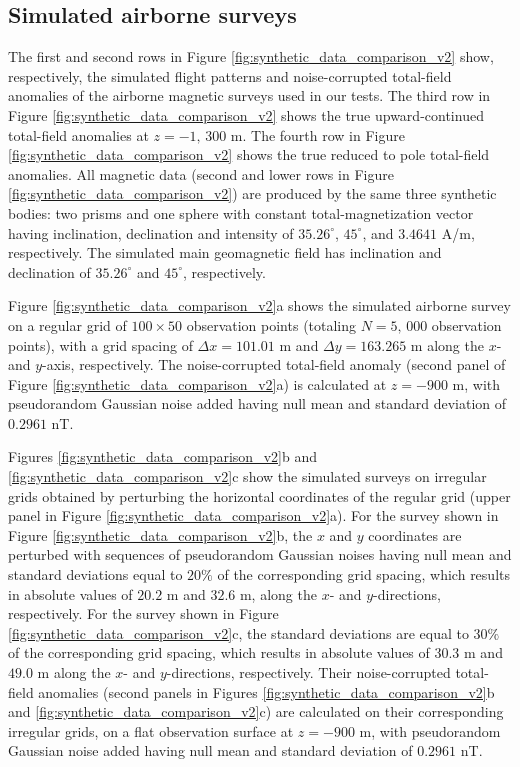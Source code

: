 \documentclass[manuscript]{geophysics}
\begin{document}
\subsection*{Simulated airborne surveys}

The first and second rows in Figure \ref{fig:synthetic_data_comparison_v2} show, respectively, 
the simulated flight patterns and noise-corrupted total-field anomalies of the airborne magnetic 
surveys used in our tests. The third row in Figure \ref{fig:synthetic_data_comparison_v2} shows 
the true upward-continued total-field anomalies at $z = -1, \, 300$ m. The fourth row in Figure \ref{fig:synthetic_data_comparison_v2} shows the true reduced to pole total-field anomalies.
All magnetic data (second and lower rows in Figure \ref{fig:synthetic_data_comparison_v2}) 
are produced by the same three synthetic bodies: two prisms and one sphere with 
constant total-magnetization vector having inclination, declination and intensity of 
$35.26^{\circ}$, $45^{\circ}$, and $3.4641$ A/m, respectively. 
The simulated main geomagnetic field has inclination and declination of $35.26^{\circ}$ and $45^{\circ}$,
respectively. 


Figure \ref{fig:synthetic_data_comparison_v2}a shows the simulated airborne survey on
a regular grid of $100 \times 50$ observation points (totaling  $N = 5,\, 000$ observation points),
with a grid spacing of $\Delta x = 101.01$ m and $\Delta y = 163.265$ m along the
$x$- and $y$-axis, respectively.
The noise-corrupted total-field anomaly (second panel of Figure \ref{fig:synthetic_data_comparison_v2}a) 
is calculated at $z = -900$ m, with pseudorandom Gaussian noise added having null mean and standard deviation of $0.2961$ nT.


Figures \ref{fig:synthetic_data_comparison_v2}b and \ref{fig:synthetic_data_comparison_v2}c 
show the simulated surveys on irregular grids obtained by perturbing the horizontal coordinates
of the regular grid (upper panel in Figure \ref{fig:synthetic_data_comparison_v2}a).
For the survey shown in Figure \ref{fig:synthetic_data_comparison_v2}b, the $x$ and $y$ coordinates 
are perturbed with sequences of pseudorandom Gaussian noises having null mean and standard deviations
equal to $20\%$ of the corresponding grid spacing, which results in
absolute values of $20.2$ m and $32.6$ m, along the $x$- and $y$-directions, respectively.
For the survey shown in Figure \ref{fig:synthetic_data_comparison_v2}c, the standard deviations
are equal to $30\%$ of the corresponding grid spacing, which results in absolute values of 
$30.3$ m and $49.0$ m along the $x$- and $y$-directions, respectively.
Their noise-corrupted total-field anomalies (second panels in Figures 
\ref{fig:synthetic_data_comparison_v2}b and \ref{fig:synthetic_data_comparison_v2}c) are calculated 
on their corresponding irregular grids, on a flat observation surface at $z = -900$ m, 
with pseudorandom Gaussian noise added having null mean and standard deviation of $0.2961$ nT.
\end{document}

